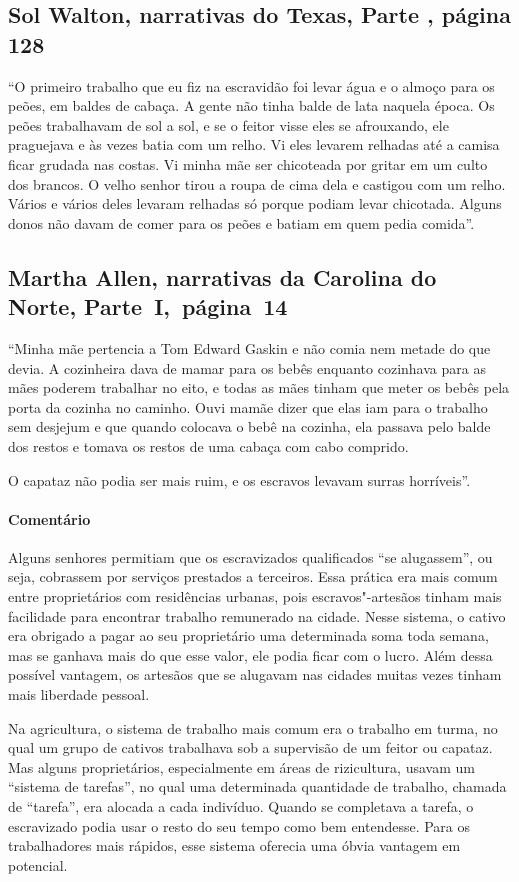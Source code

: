 \subsection{Sol Walton, narrativas do Texas, Parte , página 128}
\label{ref275}

``O primeiro trabalho que eu fiz na escravidão foi levar água e o almoço
para os peões, em baldes de cabaça. A gente não tinha balde de lata
naquela época. Os peões trabalhavam de sol a sol, e se o feitor visse
eles se afrouxando, ele praguejava e às vezes batia com um relho. Vi
eles levarem relhadas até a camisa ficar grudada nas costas. Vi minha
mãe ser chicoteada por gritar em um culto dos brancos. O velho senhor
tirou a roupa de cima dela e castigou com um relho. Vários e vários 
deles levaram relhadas só porque podiam levar chicotada. Alguns donos
não davam de comer para os peões e batiam em quem pedia comida''.

\subsection{Martha Allen, narrativas da Carolina do Norte, Parte~I,~página~14} \label{ref06}

``Minha mãe pertencia a Tom Edward Gaskin e não comia nem metade do que
devia. A cozinheira dava de mamar para os bebês enquanto cozinhava para
as mães poderem trabalhar no eito, e todas as mães tinham que meter os
bebês pela porta da cozinha no caminho. Ouvi mamãe dizer que elas iam
para o trabalho sem desjejum e que quando colocava o bebê na cozinha,
ela passava pelo balde dos restos e tomava os restos de uma cabaça com
cabo comprido.

O capataz não podia ser mais ruim, e os escravos levavam surras
horríveis''.

\paragraph{Comentário}\quad
{\small
Alguns senhores permitiam que os escravizados qualificados ``se
alugassem'', ou seja, cobrassem por serviços prestados a terceiros. Essa
prática era mais comum entre proprietários com residências urbanas, pois
escravos"-artesãos tinham mais facilidade para encontrar trabalho
remunerado na cidade. Nesse sistema, o cativo era obrigado a pagar ao
seu proprietário uma determinada soma toda semana, mas se ganhava mais
do que esse valor, ele podia ficar com o lucro. Além dessa possível
vantagem, os artesãos que se alugavam nas cidades muitas vezes tinham
mais liberdade pessoal.

Na agricultura, o sistema de trabalho mais comum era o trabalho em
turma, no qual um grupo de cativos trabalhava sob a supervisão de um
feitor ou capataz. Mas alguns proprietários, especialmente em áreas de
rizicultura, usavam um ``sistema de tarefas'', no qual uma determinada
quantidade de trabalho, chamada de ``tarefa'', era alocada a cada
indivíduo. Quando se completava a tarefa, o escravizado podia usar o
resto do seu tempo como bem entendesse. Para os trabalhadores mais
rápidos, esse sistema oferecia uma óbvia vantagem em potencial.
}

